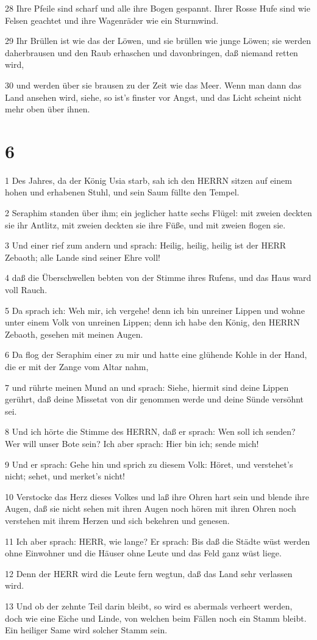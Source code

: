 \par 28 Ihre Pfeile sind scharf und alle ihre Bogen gespannt. Ihrer Rosse Hufe sind wie Felsen geachtet und ihre Wagenräder wie ein Sturmwind.
\par 29 Ihr Brüllen ist wie das der Löwen, und sie brüllen wie junge Löwen; sie werden daherbrausen und den Raub erhaschen und davonbringen, daß niemand retten wird,
\par 30 und werden über sie brausen zu der Zeit wie das Meer. Wenn man dann das Land ansehen wird, siehe, so ist's finster vor Angst, und das Licht scheint nicht mehr oben über ihnen.

\chapter{6}

\par 1 Des Jahres, da der König Usia starb, sah ich den HERRN sitzen auf einem hohen und erhabenen Stuhl, und sein Saum füllte den Tempel.
\par 2 Seraphim standen über ihm; ein jeglicher hatte sechs Flügel: mit zweien deckten sie ihr Antlitz, mit zweien deckten sie ihre Füße, und mit zweien flogen sie.
\par 3 Und einer rief zum andern und sprach: Heilig, heilig, heilig ist der HERR Zebaoth; alle Lande sind seiner Ehre voll!
\par 4 daß die Überschwellen bebten von der Stimme ihres Rufens, und das Haus ward voll Rauch.
\par 5 Da sprach ich: Weh mir, ich vergehe! denn ich bin unreiner Lippen und wohne unter einem Volk von unreinen Lippen; denn ich habe den König, den HERRN Zebaoth, gesehen mit meinen Augen.
\par 6 Da flog der Seraphim einer zu mir und hatte eine glühende Kohle in der Hand, die er mit der Zange vom Altar nahm,
\par 7 und rührte meinen Mund an und sprach: Siehe, hiermit sind deine Lippen gerührt, daß deine Missetat von dir genommen werde und deine Sünde versöhnt sei.
\par 8 Und ich hörte die Stimme des HERRN, daß er sprach: Wen soll ich senden? Wer will unser Bote sein? Ich aber sprach: Hier bin ich; sende mich!
\par 9 Und er sprach: Gehe hin und sprich zu diesem Volk: Höret, und verstehet's nicht; sehet, und merket's nicht!
\par 10 Verstocke das Herz dieses Volkes und laß ihre Ohren hart sein und blende ihre Augen, daß sie nicht sehen mit ihren Augen noch hören mit ihren Ohren noch verstehen mit ihrem Herzen und sich bekehren und genesen.
\par 11 Ich aber sprach: HERR, wie lange? Er sprach: Bis daß die Städte wüst werden ohne Einwohner und die Häuser ohne Leute und das Feld ganz wüst liege.
\par 12 Denn der HERR wird die Leute fern wegtun, daß das Land sehr verlassen wird.
\par 13 Und ob der zehnte Teil darin bleibt, so wird es abermals verheert werden, doch wie eine Eiche und Linde, von welchen beim Fällen noch ein Stamm bleibt. Ein heiliger Same wird solcher Stamm sein.

